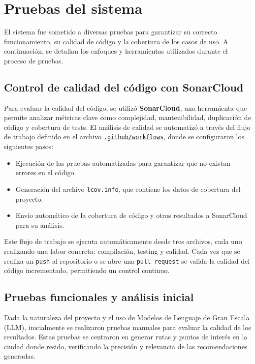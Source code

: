 \section{Pruebas del sistema}

El sistema fue sometido a diversas pruebas para garantizar su correcto funcionamiento, su calidad de código y la cobertura de los casos de uso. A continuación, se detallan los enfoques y herramientas utilizados durante el proceso de pruebas.

\subsection{Control de calidad del código con SonarCloud}

Para evaluar la calidad del código, se utilizó \textbf{SonarCloud}, una herramienta que permite analizar métricas clave como complejidad, mantenibilidad, duplicación de código y cobertura de tests. El análisis de calidad se automatizó a través del flujo de trabajo definido en el archivo \href{https://github.com/fps1001/TFGII_FPisot/tree/main/.github/workflows}{\texttt{.github/workflows}}, donde se configuraron los siguientes pasos:
\begin{itemize}
	\item Ejecución de las pruebas automatizadas para garantizar que no existan errores en el código.
	\item Generación del archivo \texttt{lcov.info}, que contiene los datos de cobertura del proyecto.
	\item Envío automático de la cobertura de código y otros resultados a SonarCloud para su análisis.
\end{itemize}

Este flujo de trabajo se ejecuta automáticamente desde tres archivos, cada uno realizando una labor concreta: compilación, testing y calidad. Cada vez que se realiza un \texttt{push} al repositorio o se abre una \texttt{pull request} se valida la calidad del código incrementado, permitiendo un control continuo.



\subsection{Pruebas funcionales y análisis inicial}

Dada la naturaleza del proyecto y el uso de Modelos de Lenguaje de Gran Escala (LLM), inicialmente se realizaron pruebas manuales para evaluar la calidad de los resultados. Estas pruebas se centraron en generar rutas y puntos de interés en la ciudad donde resido, verificando la precisión y relevancia de las recomendaciones generadas.

